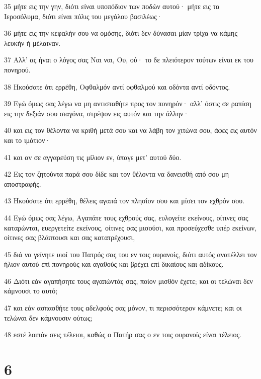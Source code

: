 \par 35 μήτε εις την γην, διότι είναι υποπόδιον των ποδών αυτού· μήτε εις τα Ιεροσόλυμα, διότι είναι πόλις του μεγάλου βασιλέως·
\par 36 μήτε εις την κεφαλήν σου να ομόσης, διότι δεν δύνασαι μίαν τρίχα να κάμης λευκήν ή μέλαιναν.
\par 37 Αλλ' ας ήναι ο λόγος σας Ναι ναι, Ου, ού· το δε πλειότερον τούτων είναι εκ του πονηρού.
\par 38 Ηκούσατε ότι ερρέθη, Οφθαλμόν αντί οφθαλμού και οδόντα αντί οδόντος.
\par 39 Εγώ όμως σας λέγω να μη αντισταθήτε προς τον πονηρόν· αλλ' όστις σε ραπίση εις την δεξιάν σου σιαγόνα, στρέψον εις αυτόν και την άλλην·
\par 40 και εις τον θέλοντα να κριθή μετά σου και να λάβη τον χιτώνα σου, άφες εις αυτόν και το ιμάτιον·
\par 41 και αν σε αγγαρεύση τις μίλιον εν, ύπαγε μετ' αυτού δύο.
\par 42 Εις τον ζητούντα παρά σου δίδε και τον θέλοντα να δανεισθή από σου μη αποστραφής.
\par 43 Ηκούσατε ότι ερρέθη, θέλεις αγαπά τον πλησίον σου και μίσει τον εχθρόν σου.
\par 44 Εγώ όμως σας λέγω, Αγαπάτε τους εχθρούς σας, ευλογείτε εκείνους, οίτινες σας καταρώνται, ευεργετείτε εκείνους, οίτινες σας μισούσι, και προσεύχεσθε υπέρ εκείνων, οίτινες σας βλάπτουσι και σας κατατρέχουσι,
\par 45 διά να γείνητε υιοί του Πατρός σας του εν τοις ουρανοίς, διότι αυτός ανατέλλει τον ήλιον αυτού επί πονηρούς και αγαθούς και βρέχει επί δικαίους και αδίκους.
\par 46 Διότι εάν αγαπήσητε τους αγαπώντάς σας, ποίον μισθόν έχετε; και οι τελώναι δεν κάμνουσι το αυτό;
\par 47 και εάν ασπασθήτε τους αδελφούς σας μόνον, τι περισσότερον κάμνετε; και οι τελώναι δεν κάμνουσιν ούτως;
\par 48 εστέ λοιπόν σεις τέλειοι, καθώς ο Πατήρ σας ο εν τοις ουρανοίς είναι τέλειος.

\chapter{6}

